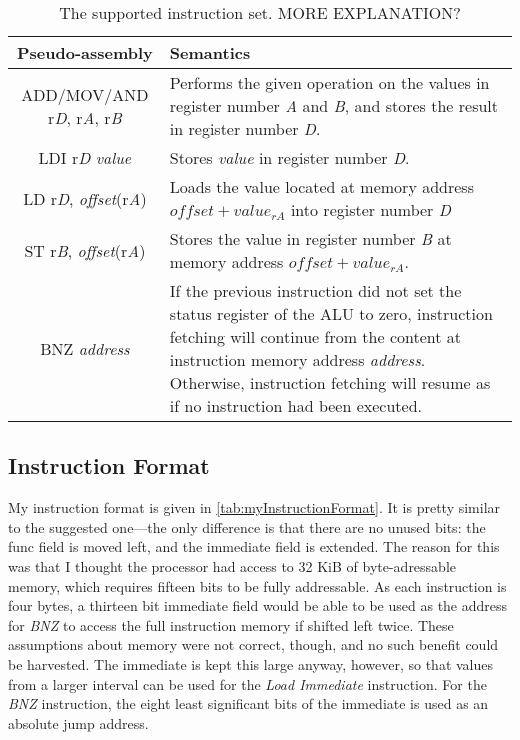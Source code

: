 \documentclass[11pt]{article}
\begin{document}
\begin{table}[htbp]
  \centering
  \begin{tabular}{|c|p{190pt}|}
    \hline
    {\bf Pseudo-assembly} & {\bf Semantics} \\ \hline
    ADD/MOV/AND r{\em D}, r{\em A}, r{\em B} &  Performs the given operation on the values in register number {\em A} and {\em B}, and stores the result in register number {\em D}. \\ \hline
    LDI r{\em D} {\em value} & Stores {\em value} in register number {\em D}. \\ \hline
    LD r{\em D}, {\em offset}(r{\em A}) & Loads the value located at memory address $offset + value_{rA}$ into register number {\em D} \\ \hline
    ST r{\em B}, {\em offset}(r{\em A}) & Stores the value in register number {\em B} at memory address $offset + value_{rA}$. \\ \hline
    BNZ {\em address} & If the previous instruction did not set the status register of the ALU to zero, instruction fetching will continue from the content at instruction memory address {\em address}. Otherwise, instruction fetching will resume as if no instruction had been executed. \\ \hline
  \end{tabular}
  \caption{The supported instruction set. MORE EXPLANATION?}
  \label{tab:instructionSet}
\end{table}

\subsection{Instruction Format}
\label{subsec:instructionFormat}
My instruction format is given in
\autoref{tab:myInstructionFormat}. It is pretty similar to the
suggested one---the only difference is that there are no unused bits:
the func field is moved left, and the immediate field is extended. The
reason for this was that I thought the processor had access to 32 KiB
of byte-adressable memory, which requires fifteen bits to be fully
addressable. As each instruction is four bytes, a thirteen bit
immediate field would be able to be used as the address for {\em BNZ}
to access the full instruction memory if shifted left twice. These
assumptions about memory were not correct, though, and no such benefit
could be harvested. The immediate is kept this large anyway, however,
so that values from a larger interval can be used for the {\em Load
  Immediate} instruction. For the {\em BNZ} instruction, the eight
least significant bits of the immediate is used as an absolute jump
address.
\end{document}
